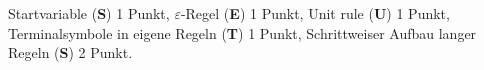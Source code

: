\begin{bewertung}
Startvariable ({\bf S}) 1 Punkt,
$\varepsilon$-Regel ({\bf E}) 1 Punkt,
Unit rule ({\bf U}) 1 Punkt,
Terminalsymbole in eigene Regeln ({\bf T}) 1 Punkt,
Schrittweiser Aufbau langer Regeln ({\bf S}) 2 Punkt.
\end{bewertung}

